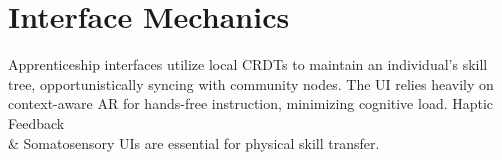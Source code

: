 \section{Interface Mechanics}
Apprenticeship interfaces utilize local CRDTs to maintain an individual's skill tree, opportunistically syncing with community nodes. The UI relies heavily on context-aware AR for hands-free instruction, minimizing cognitive load. Haptic Feedback \\\& Somatosensory UIs are essential for physical skill transfer.
